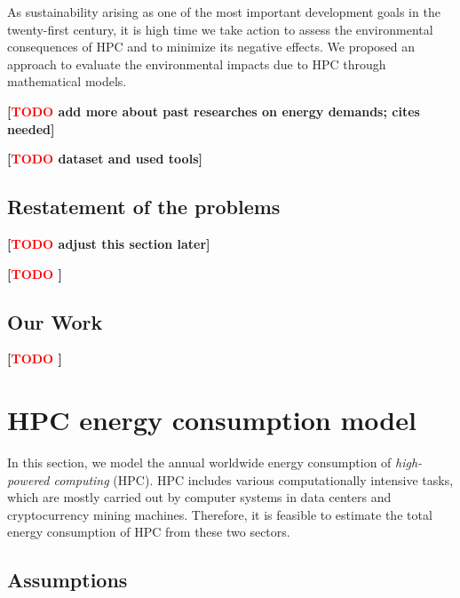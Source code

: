 \documentclass[12pt]{article}
\newcommand{\todo}[1]{\textbf{[\textcolor{red}{TODO} #1]}}
\begin{document}
As sustainability arising as one of the most important development goals in the twenty-first century, it is high time we take action to assess the environmental consequences of HPC and to minimize its negative effects. We proposed an approach to evaluate the environmental impacts due to HPC through mathematical models.

\todo{add more about past researches on energy demands; cites needed}

\todo{dataset and used tools}

\subsection{Restatement of the problems}

\todo{adjust this section later}

\todo{}

\subsection{Our Work}

\todo{}

\section{HPC energy consumption model}

In this section, we model the annual worldwide energy consumption of \textit{high-powered computing} (HPC). HPC includes various computationally intensive tasks, which are mostly carried out by computer systems in data centers and cryptocurrency mining machines. Therefore, it is feasible to estimate the total energy consumption of HPC from these two sectors.

\subsection{Assumptions}
\label{sec_energy_model_assumptions}
\end{document}
